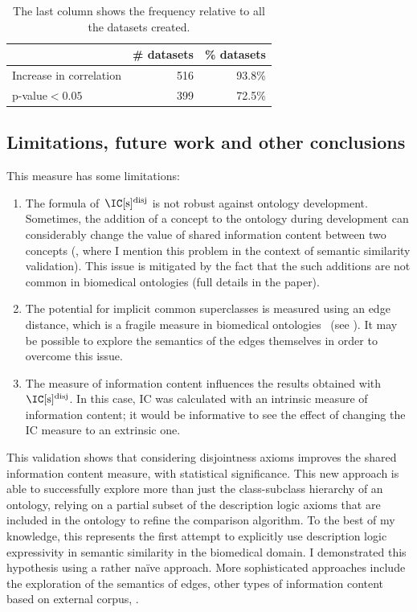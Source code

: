 \begin{table}[p]
    \centering
    \small
    \caption[Statistics related to the histogram of ]{The last column shows the frequency relative to all the datasets created.}
    \begin{tabular}{lrr}
    \toprule
        & \bfseries \# datasets & \bfseries \% datasets \\
    \midrule
    Increase in correlation & 516 &  93.8\% \\
    p-value${}<0.05$        & 399 &  72.5\% \\
    \bottomrule
    \end{tabular}
    \label{tab:histogram}
\end{table}


\subsection{Limitations, future work and other conclusions}

This measure has some limitations:
\begin{enumerate}
    \item The formula of~$\ICsdis$ is not robust against ontology development. Sometimes, the addition of a concept to the ontology during development can considerably change the value of shared information content between two concepts (\cf {}, where I mention this problem in the context of semantic similarity validation). This issue is mitigated by the fact that the such additions are not common in biomedical ontologies (full details in the paper).
    \item The potential for implicit common superclasses is measured using an edge distance, which is a fragile measure in biomedical ontologies~\citep{Pesquita2009} (see ). It may be possible to explore the semantics of the edges themselves in order to overcome this issue.
    \item The measure of information content influences the results obtained with~$\ICsdis$. In this case, IC was calculated with an intrinsic measure of information content; it would be informative to see the effect of changing the IC measure to an extrinsic one.
\end{enumerate}

This validation shows that considering disjointness axioms improves the shared information content measure, with statistical significance. This new approach is able to successfully explore more than just the class-subclass hierarchy of an ontology, relying on a partial subset of the description logic axioms that are included in the ontology to refine the comparison algorithm. To the best of my knowledge, this represents the first attempt to explicitly use description logic expressivity in semantic similarity in the biomedical domain. I demonstrated this hypothesis using a rather naïve approach. More sophisticated approaches include the exploration of the semantics of edges, other types of information content based on external corpus, \etc.

